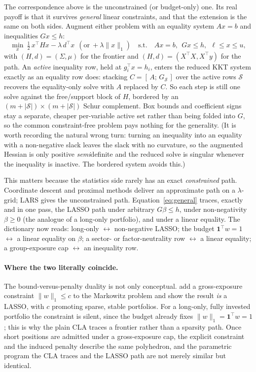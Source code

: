 \documentclass[11pt]{article}
\newcommand{\Sig}{\Sigma}
\newcommand{\Sset}{\mathcal{S}}
\newcommand{\trans}{^{\top}}
\newcommand{\lb}{\ell}
\newcommand{\ub}{u}
\begin{document}
The correspondence above is the unconstrained (or budget-only) one. Its real
payoff is that it survives \emph{general} linear constraints, and that the
extension is the same on both sides. Augment either problem with an equality system
$A x = b$ and inequalities $G x \le h$:
\begin{equation}
\label{eq:general}
\min_x\ \tfrac12\, x\trans H x - \lambda\, d\trans x \ \ (\text{or}\ +\lambda\|x\|_1)
\quad\text{s.t.}\quad A x = b,\ \ G x \le h,\ \ \lb \le x \le \ub,
\end{equation}
with $(H,d)=(\Sig,\mu)$ for the frontier and $(H,d)=(X\trans X, X\trans y)$ for the
path. An \emph{active} inequality row, held at $g_i\trans x = h_i$, enters the
reduced KKT system exactly as an equality row does: stacking
$C=[\,A;\,G_{\Sset}\,]$ over the active rows $\Sset$ recovers the equality-only
solve with $A$ replaced by $C$. So each step is still one solve against the
free/support block of $H$, bordered by an $(m+|\Sset|)\times(m+|\Sset|)$ Schur
complement. Box bounds and coefficient signs stay a separate, cheaper per-variable
active set rather than being folded into $G$, so the common constraint-free problem
pays nothing for the generality. (It is worth recording the natural wrong turn:
turning an inequality into an equality with a non-negative slack leaves the slack
with no curvature, so the augmented Hessian is only positive \emph{semi}definite and
the reduced solve is singular whenever the inequality is inactive. The bordered
system avoids this.)

This matters because the statistics side rarely has an exact \emph{constrained}
path. Coordinate descent and proximal methods deliver an approximate path on a
$\lambda$-grid; LARS gives the unconstrained path. Equation~\eqref{eq:general}
traces, exactly and in one pass, the LASSO path under arbitrary $G\beta \le h$, under
non-negativity $\beta\ge 0$ (the analogue of a long-only portfolio), and under a
linear equality. The dictionary now reads: long-only $\leftrightarrow$ non-negative
LASSO; the budget $\mathbf{1}\trans w = 1$ $\leftrightarrow$ a linear equality on
$\beta$; a sector- or factor-neutrality row $\leftrightarrow$ a linear equality;
a group-exposure cap $\leftrightarrow$ an inequality row.

\paragraph{Where the two literally coincide.}
The bound-versus-penalty duality is not only conceptual. \citet{brodie2009} add a
gross-exposure constraint $\|w\|_1 \le c$ to the Markowitz problem and show the
result \emph{is} a LASSO, with $c$ promoting sparse, stable portfolios. For a
long-only, fully invested portfolio the constraint is silent, since the budget
already fixes $\|w\|_1 = \mathbf{1}\trans w = 1$; this is why the plain CLA traces a
frontier rather than a sparsity path. Once short positions are admitted under a
gross-exposure cap, the explicit constraint and the induced penalty describe the
same polyhedron, and the parametric program the CLA traces and the LASSO path are
not merely similar but identical.
\end{document}
